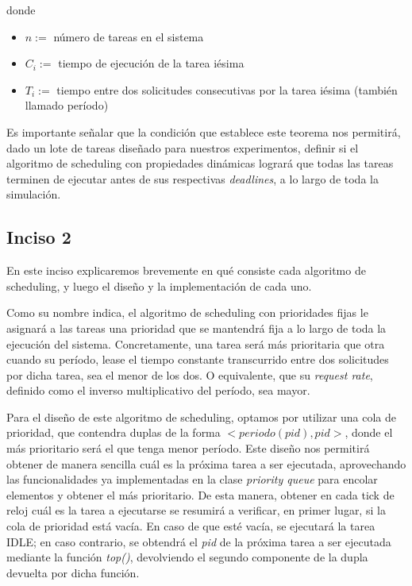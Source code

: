 donde
\begin{itemize}
  \item $n:=$ n\'umero de tareas en el sistema
  \item $C_{i}:=$ tiempo de ejecuci\'on de la tarea i\'esima
  \item $T_{i}:=$ tiempo entre dos solicitudes consecutivas por la tarea i\'esima (tambi\'en llamado per\'iodo)
\end{itemize}

Es importante se\~nalar que la condici\'on que establece este teorema nos permitir\'a, dado un lote de tareas dise\~nado para nuestros experimentos, definir 
si el algoritmo de scheduling con propiedades din\'amicas lograr\'a que todas las tareas terminen de ejecutar antes de sus respectivas \textit{deadlines}, a lo 
largo de toda la simulaci\'on.

\subsection*{Inciso 2}

En este inciso explicaremos brevemente en qu\'e consiste cada algoritmo de scheduling, y luego el dise\~no y la implementaci\'on de cada uno.

Como su nombre indica, el algoritmo de scheduling con prioridades fijas le asignar\'a a las tareas una prioridad que se mantendr\'a fija a lo largo de 
toda la ejecuci\'on del sistema. Concretamente, una tarea ser\'a m\'as prioritaria que otra cuando su per\'iodo, lease el tiempo constante transcurrido entre
dos solicitudes por dicha tarea, sea el menor de los dos. O equivalente, que su \textit{request rate}, definido como el inverso multiplicativo del per\'iodo,
sea mayor. 

Para el dise\~no de este algoritmo de scheduling, optamos por utilizar una cola de prioridad, que contendra duplas de la forma 
$<periodo(pid),pid>$, donde el m\'as prioritario ser\'a el que tenga menor per\'iodo. Este dise\~no nos permitir\'a obtener de manera sencilla cu\'al es
la pr\'oxima tarea a ser ejecutada, aprovechando las funcionalidades ya implementadas en la clase \textit{priority queue} para encolar elementos y obtener
el m\'as prioritario. De esta manera, obtener en cada tick de reloj cu\'al es la tarea a ejecutarse se resumir\'a a verificar, en primer lugar, si la 
cola de prioridad est\'a vac\'ia. En caso de que est\'e vac\'ia, se ejecutar\'a la tarea IDLE; en caso contrario, se obtendr\'a el \textit{pid} de la 
pr\'{o}xima tarea a ser ejecutada mediante la funci\'on \textit{top()}, devolviendo el segundo componente de la dupla devuelta por dicha funci\'on.

